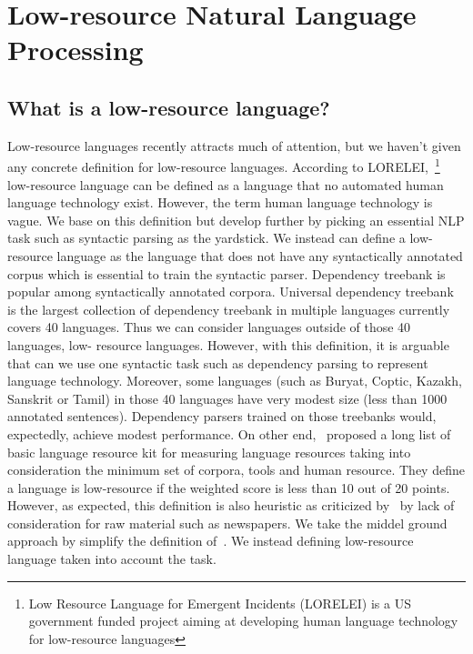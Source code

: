 \documentclass[12pt,twoside,final,hidelinks]{ltthesis}
\theoremstyle{definition}
\begin{document}
\section{Low-resource Natural Language Processing}
\subsection{What is a low-resource language? }
Low-resource languages recently attracts much of attention, but we haven't given 
any concrete definition for low-resource languages. According to LORELEI,~\footnote{Low Resource Language for Emergent Incidents (LORELEI) is a US government funded project aiming at developing 
human language technology for low-resource languages} low-resource 
language can be defined as a language that no automated human language technology exist. 
However, the term human language technology is vague. We base on this definition 
but develop further by picking an essential NLP task such as syntactic parsing as the yardstick. 
We instead can define a low-resource language as the 
language that does not have any syntactically annotated corpus which is essential 
to train the syntactic parser. Dependency treebank is popular among syntactically annotated corpora. 
Universal dependency treebank~\cite{11234/1-1699} 
is the largest collection of dependency treebank in multiple languages currently 
covers 40 languages. Thus we can consider languages outside of those 40 languages, low-
resource languages. However, with this definition, it is arguable that can we use one syntactic task such as 
dependency parsing to represent language technology. Moreover, some languages (such as Buryat, Coptic, Kazakh, Sanskrit or Tamil) in those 40 languages have very modest size (less than 1000 annotated sentences). Dependency parsers trained on those treebanks would, expectedly, achieve 
modest performance. On other end,~ proposed a long list of basic language resource kit for measuring language resources taking into consideration the minimum set of corpora, tools and human resource. They define a language is low-resource if the weighted score is less than 10 out of 20 points. However, as expected, this definition is also heuristic as criticized by~ by lack of consideration for raw material such as newspapers. 
We take the middel ground approach by simplify the definition of~. 
We instead defining low-resource language taken into account the task. 
\end{document}
